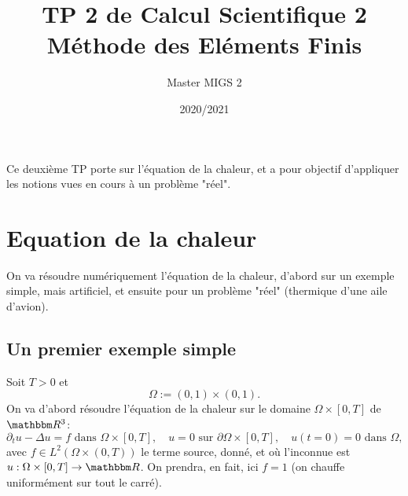 


\newcommand{\eps}{\varepsilon}

\usepackage{url}

\title{TP 2 de Calcul Scientifique 2\\ Méthode des Eléments Finis}

\author{Master MIGS 2}

\date{2020/2021}



\maketitle

%

Ce deuxième TP porte sur l'équation de la chaleur, et a pour objectif d'appliquer les notions vues en cours à un problème "réel".

\parindent0mm
\section{Equation de la chaleur}

On va résoudre numériquement l'équation de la chaleur, d'abord sur un exemple simple, mais artificiel, et ensuite pour un problème "réel" (thermique d'une aile d'avion).

\subsection{Un premier exemple simple}

Soit $T>0$ et \[
\Omega := (0,1) \times (0,1).
\]
On va d'abord résoudre l'équation de la chaleur sur le domaine $\Omega \times [0,T]$ de $\eR^3$:
\[
\partial_t u -\Delta u = f \textrm{ dans } \Omega \times [0,T],
\quad
u = 0 \textrm{ sur } \partial \Omega \times [0,T],
\quad
u(t=0) = 0 \textrm{ dans } \Omega,
\]
avec $f \in L^2(\Omega \times (0,T))$ le terme source, donné, et où l'inconnue est $u : \Omega \times [0,T] \rightarrow \eR$. On prendra, en fait, ici $f=1$ (on chauffe uniformément sur tout le carré).

